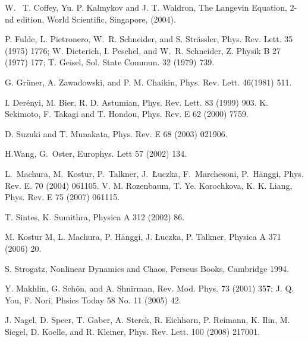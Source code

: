 \documentclass[a4,twocolumn,showpacs,showkeys]{revtex4}
\begin{document}
\begin{thebibliography}{99}
 W.~ T. Coffey, Yu. P. Kalmykov and J. T. Waldron, 
    The Langevin Equation, 2-nd edition, World Scientific,
  Singapore, (2004).

 P. Fulde, L. Pietronero, W.~R. Schneider, and S.
  Str\"assler, Phys.  Rev. Lett.  35 (1975) 1776; W. Dieterich,
  I. Peschel, and W.~R. Schneider, Z. Physik B  27 (1977) 177;
  T. Geisel, Sol.  State Commun.  32 (1979) 739.

 G. Gr\"uner, A. Zawadowski, and P. M. Chaikin, Phys.
  Rev. Lett. 46(1981) 511.
	
 I.  Derényi, M.  Bier,  R. D.  Astumian, 
Phys. Rev. Lett. 83 (1999) 903. 
 K. Sekimoto, F. Takagi and T. Hondou,  Phys. Rev. E 62 (2000) 7759.

 D. Suzuki and T. Munakata, Phys. Rev. E  68 (2003) 021906.

 H.Wang, G.~Oster, Europhys. Lett  57 (2002) 134.

L.~Machura, M.~Kostur, P.~Talkner, J.~{\L}uczka, F.~Marchesoni, P.~H\"anggi,
  Phys. Rev. E.  70 (2004) 061105.
 V. M. Rozenbaum, T. Ye. Korochkova, K. K. Liang, Phys. Rev. E 75 (2007) 061115.  

 T. Sintes, K. Sumithra, Physica A 312 (2002) 86. 

 M. Kostur M, L.  Machura, P.  H\"anggi,  J. {\L}uczka, P. Talkner,  Physica A  371 (2006)  20. 

 S. Strogatz,  Nonlinear Dynamics and Chaos,
  Perseus Books, Cambridge 1994.

   Y.  Makhlin, G. Sch\"on, and A.  Shnirman, Rev. Mod. Phys. 73 (2001) 357; 
J. Q. You, F. Nori, Phsics Today 58 No. 11  (2005) 42.

J. Nagel, D. Speer, T. Gaber, A. Sterck, R. Eichhorn, P. Reimann, K. Ilin, M. Siegel, D. Koelle, and R. Kleiner, Phys. Rev. Lett. 100 (2008) 217001.

\end{thebibliography}
\end{document}

